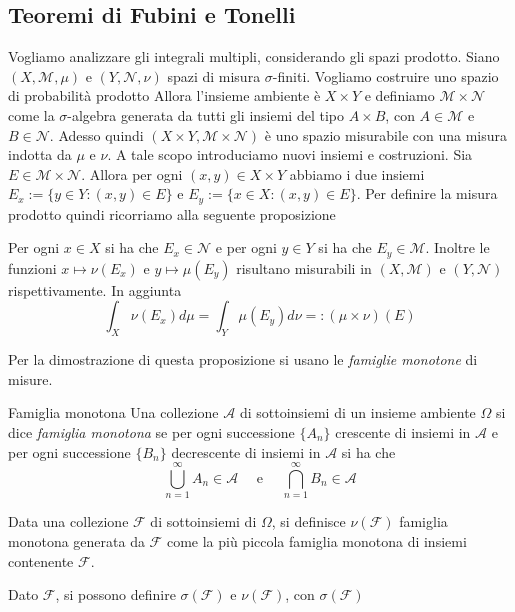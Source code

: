 \subsection{Teoremi di Fubini e Tonelli}
Vogliamo analizzare gli integrali multipli, considerando gli spazi prodotto.
Siano \((X, \mathcal{M}, \mu)\) e \((Y, \mathcal{N}, \nu)\) spazi di misura
\(\sigma\)-finiti. Vogliamo costruire uno spazio di probabilità prodotto
Allora l'insieme ambiente è \(X \times Y\) e definiamo \(\mathcal{M} \times
\mathcal{N}\) come la \(\sigma\)-algebra generata da tutti gli insiemi del tipo
\(A \times B\), con \(A \in \mathcal{M}\) e \(B \in \mathcal{N}\). Adesso quindi
\((X \times Y, \mathcal{M} \times \mathcal{N})\) è uno spazio misurabile con una 
misura indotta da \(\mu\) e \(\nu\). A tale scopo introduciamo nuovi insiemi e
costruzioni.
Sia \(E \in \mathcal{M} \times \mathcal{N}\). Allora per ogni \((x,y) \in X
\times Y\) abbiamo i due insiemi  \(E_x := \{y \in Y : (x, y)
\in E\} \) e \(E_{y} := \{x \in X : (x, y) \in E\} \). Per definire la misura
prodotto quindi ricorriamo alla seguente proposizione
\begin{proposition}\label{prop:def_misura_prodotto}
    Per ogni \(x \in X\) si ha che \(E_x \in \mathcal{N}\) e per ogni \(y
    \in Y\) si ha che \(E_y \in \mathcal{M}\). Inoltre le funzioni \(x \mapsto
    \nu(E_x)\) e \(y \mapsto \mu(E_y)\) risultano misurabili in \((X,
    \mathcal{M})\) e \((Y, \mathcal{N})\) rispettivamente. In aggiunta
    \[
        \int_X \nu(E_x) d\mu = \int_Y \mu(E_y) d\nu =: (\mu \times \nu)(E)
    \]
\end{proposition}
Per la dimostrazione di questa proposizione si usano le \emph{famiglie
monotone} di misure.
\begin{definition}{Famiglia monotona}
Una collezione \(\mathcal{A}\) di sottoinsiemi di un
insieme ambiente \(\Omega\) si dice \emph{famiglia monotona} se per ogni
successione \(\{A_{n}\} \) crescente di insiemi in \(\mathcal{A}\) e per ogni
successione \(\{B_{n}\} \) decrescente di insiemi in \(\mathcal{A}\) si ha che
\[
    \bigcup_{n=1}^{\infty} A_{n} \in \mathcal{A} \quad \text{ e } \quad
    \bigcap_{n=1}^{\infty} B_{n} \in \mathcal{A}
\]
\end{definition}
Data una collezione \(\mathcal{F}\) di sottoinsiemi di \(\Omega\), si definisce
\(\nu(\mathcal{F})\) famiglia monotona generata da \(\mathcal{F}\) come la più
piccola famiglia monotona di insiemi contenente \(\mathcal{F}\). 
\begin{remark}
    Dato \(\mathcal{F}\), si possono definire \(\sigma(\mathcal{F})\) e
    \(\nu(\mathcal{F})\), con \(\sigma(\mathcal{F})\) 
\end{remark}

